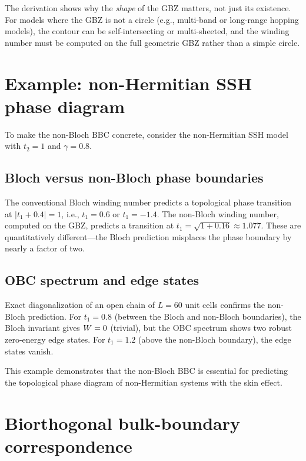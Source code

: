 \begin{remark}
The derivation shows why the \emph{shape} of the GBZ matters, not just
its existence. For models where the GBZ is not a circle (e.g.,
multi-band or long-range hopping models), the contour can be
self-intersecting or multi-sheeted, and the winding number must be
computed on the full geometric GBZ rather than a simple circle.
\end{remark}


\section{Example: non-Hermitian SSH phase diagram}
\label{sec:nh-ssh-example}

To make the non-Bloch BBC concrete, consider the non-Hermitian SSH
model with $t_2 = 1$ and $\gamma = 0.8$.

\subsection{Bloch versus non-Bloch phase boundaries}
\label{ssec:phase-boundaries}

The conventional Bloch winding number predicts a topological phase
transition at $|t_1 + 0.4| = 1$, i.e., $t_1 = 0.6$ or $t_1 = -1.4$.
The non-Bloch winding number, computed on the GBZ, predicts a
transition at $t_1 = \sqrt{1 + 0.16} \approx 1.077$. These are
quantitatively different---the Bloch prediction misplaces the phase
boundary by nearly a factor of two.

\subsection{OBC spectrum and edge states}
\label{ssec:obc-edge}

Exact diagonalization of an open chain of $L = 60$ unit cells confirms
the non-Bloch prediction. For $t_1 = 0.8$ (between the Bloch and
non-Bloch boundaries), the Bloch invariant gives $W = 0$ (trivial),
but the OBC spectrum shows two robust zero-energy edge states. For
$t_1 = 1.2$ (above the non-Bloch boundary), the edge states vanish.

This example demonstrates that the non-Bloch BBC is essential for
predicting the topological phase diagram of non-Hermitian systems with
the skin effect.


\section{Biorthogonal bulk-boundary correspondence}
\label{sec:biorthogonal-bbc}

